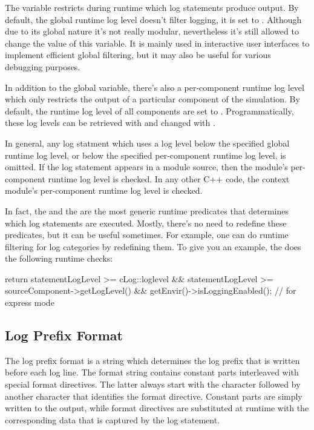 The  variable restricts during runtime which log statements
produce output. By default, the global runtime log level doesn't filter logging,
it is set to . Although due to its global nature it's not
really modular, nevertheless it's still allowed to change the value of this
variable. It is mainly used in interactive user interfaces to implement efficient
global filtering, but it may also be useful for various debugging purposes.

In addition to the global variable, there's also a per-component runtime log
level which only restricts the output of a particular component of the
simulation. By default, the runtime log level of all components are set to
. Programmatically, these log levels can be retrieved
with  and changed with
.

In general, any log statment which uses a log level below the specified global
runtime log level, or below the specified per-component runtime log level, is
omitted. If the log statement appears in a module source, then the module's
per-component runtime log level is checked. In any other C++ code, the context
module's per-component runtime log level is checked.

In fact, the  and the 
are the most generic runtime predicates that determines which log statements are
executed. Mostly, there's no need to redefine these predicates, but it can be
useful sometimes. For example, one can do runtime filtering for log categories
by redefining them. To give you an example, the 
does the following runtime checks:

\begin{cpp}
return statementLogLevel >= cLog::loglevel &&
       statementLogLevel >= sourceComponent->getLogLevel() &&
       getEnvir()->isLoggingEnabled(); // for express mode
\end{cpp}

\subsection{Log Prefix Format}
\label{sec:config-sim:log-prefix-format}

The log prefix format is a string which determines the log prefix that is written
before each log line. The format string contains constant parts interleaved with
special format directives. The latter always start with the \ttt{\%} character
followed by another character that identifies the format directive. Constant
parts are simply written to the output, while format directives are substituted
at runtime with the corresponding data that is captured by the log statement.

